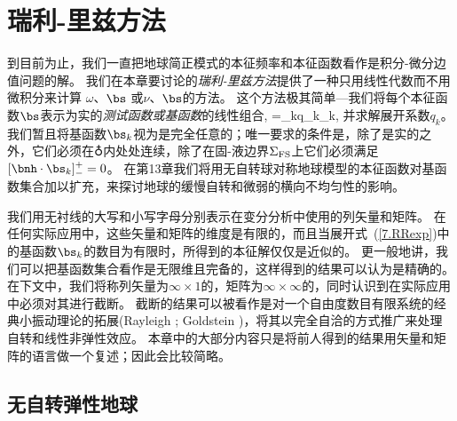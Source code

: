 \chapter{瑞利-里兹方法}

到目前为止，我们一直把地球简正模式的本征频率和本征函数看作是积分-微分边值问题的解。
我们在本章要讨论的{\em 瑞利-里兹方法\/}提供了一种只用线性代数而不用微积分来计算 $\omega$、$\bs$ 或$\nu$、$\bs$的方法。
这个方法极其简单---我们将每个本征函数$\bs$表示为实的{\em 测试函数或基函数\/}的线性组合,
%
%
\eq
\label{7.RRexp}
\bs=\sum_kq_k\bs_k,
\en
并求解展开系数$q_k$。
我们暂且将基函数$\bs_k$视为是完全任意的；唯一要求的条件是，除了是实的之外，它们必须在$\earth$内处处连续，除了在固-液边界$\Sigma_{\rm FS}$上它们必须满足$[\bnh\cdot\bs_k]^+_-=0$。
在第13章我们将用无自转球对称地球模型的本征函数对基函数集合加以扩充，来探讨地球的缓慢自转和微弱的横向不均匀性的影响。

我们用无衬线的大写和小写字母分别表示在变分分析中使用的列矢量和矩阵。
在任何实际应用中，这些矢量和矩阵的维度是有限的，而且当展开式~(\ref{7.RRexp})中的基函数$\bs_k$的数目为有限时，所得到的本征解仅仅是近似的。
更一般地讲，我们可以把基函数集合看作是无限维且完备的，这样得到的结果可以认为是精确的。
在下文中，我们将称列矢量为$\infty\times 1$的，矩阵为$\infty\times \infty$的，同时认识到在实际应用中必须对其进行截断。
截断的结果可以被看作是对一个自由度数目有限系统的经典小振动理论的拓展(Rayleigh \citeyear{rayleigh77};
Goldstein \citeyear{goldstein80})，将其以完全自洽的方式推广来处理自转和线性非弹性效应。
本章中的大部分内容只是将前人得到的结果用矢量和矩阵的语言做一个复述；因此会比较简略。

\section{无自转弹性地球}
%
%
\label{7.sec.nrel}

